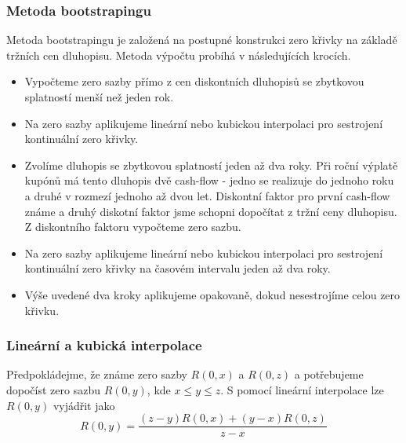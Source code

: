 \documentclass[a4paper]{book}
\begin{document}
\subsubsection{Metoda bootstrapingu}

Metoda bootstrapingu je založená na postupné konstrukci zero křivky na základě tržních cen dluhopisu. Metoda výpočtu probíhá v následujících krocích.
\begin{itemize}
\item Vypočteme zero sazby přímo z cen diskontních dluhopisů se zbytkovou splatností menší než jeden rok.
\item Na zero sazby aplikujeme lineární nebo kubickou interpolaci pro sestrojení kontinuální zero křivky.
\item Zvolíme dluhopis se zbytkovou splatností jeden až dva roky. Při roční výplatě kupónů má tento dluhopis dvě cash-flow - jedno se realizuje do jednoho roku a druhé v rozmezí jednoho až dvou let. Diskontní faktor pro první cash-flow známe a druhý diskotní faktor jsme schopni dopočítat z tržní ceny dluhopisu. Z diskontního faktoru vypočteme zero sazbu.
\item Na zero sazby aplikujeme lineární nebo kubickou interpolaci pro sestrojení kontinuální zero křivky na časovém intervalu jeden až dva roky.
\item Výše uvedené dva kroky aplikujeme opakovaně, dokud nesestrojíme celou zero křivku.
\end{itemize}

\subsubsection{Lineární a kubická interpolace}

Předpokládejme, že známe zero sazby $R(0,x)$ a $R(0,z)$ a potřebujeme dopočíst zero sazbu $R(0,y)$, kde $x \le y \le z$. S pomocí lineární interpolace lze $R(0,y)$ vyjádřit jako
\begin{equation*}
R(0,y) = \frac{(z-y)R(0,x) + (y - x)R(0,z)}{z - x}
\end{equation*}
\end{document}

